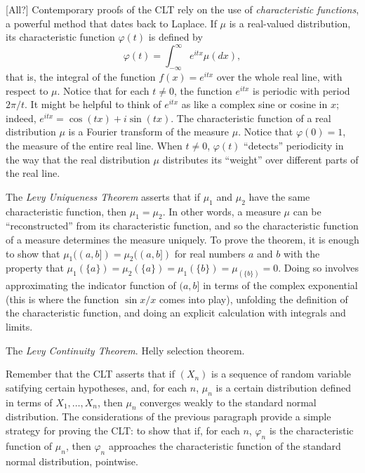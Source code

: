 \documentclass{article}
\newcommand{\ph}{\varphi}
\begin{document}
[All?] Contemporary proofs of the CLT rely on the use of \emph{characteristic functions}, a powerful method that dates back to Laplace. If $\mu$ is a real-valued distribution, its characteristic function $\ph(t)$ is defined by
\[
\ph(t) = \int_{-\infty}^{\infty} e^{itx} \mu(dx),
\]
that is, the integral of the function $f(x) = e^{itx}$ over the whole real line, with respect to $\mu$. Notice that for each $t \neq 0$, the function $e^{itx}$ is periodic with period $2 \pi / t$. It might be helpful to think of $e^{itx}$ as like a complex sine or cosine in $x$; indeed, $e^{itx}= \cos (t x) + i \sin (t x)$. 
The characteristic function of a real distribution $\mu$ is a Fourier transform of the measure $\mu$. Notice that $\ph(0) = 1$, the measure of the entire real line. When $t \neq 0$, $\ph(t)$ ``detects'' periodicity in the way that the real distribution $\mu$ distributes its ``weight'' over different parts of the real line. 

The \emph{Levy Uniqueness Theorem} asserts that if $\mu_1$ and $\mu_2$ have the same characteristic function, then $\mu_1 = \mu_2$. In other words, a measure $\mu$ can be ``reconstructed'' from its characteristic function, and so the characteristic function of a measure determines the measure uniquely. To prove the theorem, it is enough to show that $\mu_1((a,b]) = \mu_2((a,b])$ for real numbers $a$ and $b$ with the property that $\mu_1(\{a\}) = \mu_2(\{a\}) = \mu_1(\{b\}) = \mu_(\{b\}) = 0$. Doing so involves approximating the indicator function of $(a,b]$ in terms of the complex exponential (this is where the function $\sin x / x$ comes into play), unfolding the definition of the characteristic function, and doing an explicit calculation with integrals and limits.

The \emph{Levy Continuity Theorem}. Helly selection theorem. 



Remember that the CLT asserts that if $(X_n)$ is a sequence of random variable satifying certain hypotheses, and, for each $n$, $\mu_n$ is a certain distribution defined in terms of $X_1, \ldots, X_n$, then $\mu_n$ converges weakly to the standard normal distribution. The considerations of the previous paragraph provide a simple strategy for proving the CLT: to show that if, for each $n$, $\ph_n$ is the characteristic function of $\mu_n$, then $\ph_n$ approaches the characteristic function of the standard normal distribution, pointwise.
\end{document}
